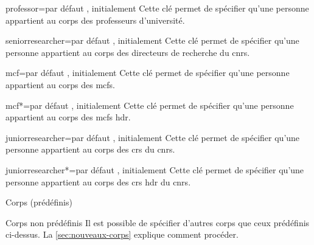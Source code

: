 \begin{docKey}{professor}{=\textbar{}}{par défaut
    , initialement }
  Cette clé permet de spécifier qu'une personne appartient au corps des
  professeurs d'université.
\end{docKey}
%
\begin{docKey}{seniorresearcher}{=\textbar{}}{par
    défaut , initialement }
  Cette clé permet de spécifier qu'une personne appartient au corps des
  directeurs de recherche du \gls{cnrs}.
\end{docKey}
%
\begin{docKey}{mcf}{=\textbar{}}{par défaut
    , initialement }
  Cette clé permet de spécifier qu'une personne appartient au corps des
  \glspl{mcf}.
\end{docKey}
%
\begin{docKey}{mcf*}{=\textbar{}}{par défaut
    , initialement }
  Cette clé permet de spécifier qu'une personne appartient au corps des
  \glspl{mcf} \gls{hdr}.
\end{docKey}
%
\begin{docKey}{juniorresearcher}{=\textbar{}}{par
    défaut , initialement }
  Cette clé permet de spécifier qu'une personne appartient au corps des
  \glspl{cr} du \gls{cnrs}.
\end{docKey}
%
\begin{docKey}{juniorresearcher*}{=\textbar{}}{par
    défaut , initialement }
  Cette clé permet de spécifier qu'une personne appartient au corps des
  \glspl{cr} \gls{hdr} du \gls{cnrs}.
\end{docKey}
%
\begin{dbexample}{Corps (prédéfinis)}{}
\begin{bodycode}
%
%
\end{bodycode}
\end{dbexample}
%
\begin{dbremark}{Corps non prédéfinis}{}
  Il est possible de spécifier d'autres corps que ceux prédéfinis ci-dessus. La
  \vref{sec:nouveaux-corps} explique comment procéder.
\end{dbremark}
